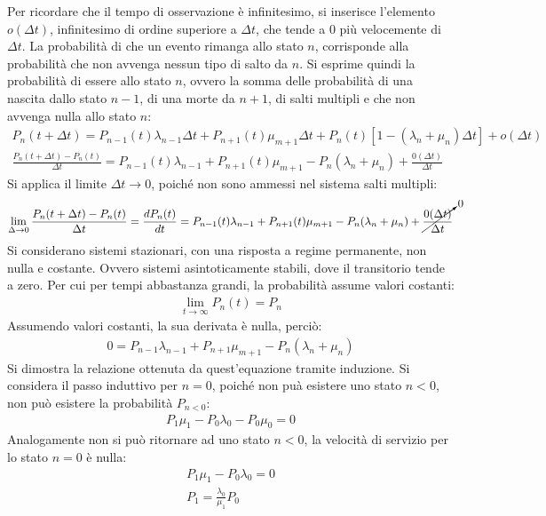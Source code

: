 \documentclass{article}
\numberwithin{equation}{subsection}
\begin{document}
Per ricordare che il tempo di osservazione è infinitesimo, si inserisce l'elemento $o(\Delta t)$, infinitesimo di ordine superiore a $\Delta t$, che tende a $0$ più 
velocemente di $\Delta t$. La probabilità di che un evento rimanga allo stato $n$, corrisponde alla probabilità che non avvenga nessun tipo di salto da $n$. Si 
esprime quindi la probabilità di essere allo stato $n$, ovvero la somma delle probabilità di una nascita dallo stato $n-1$, di una morte da $n+1$, di salti multipli e che 
non avvenga nulla allo stato $n$:
\begin{gather*}
    P_n(t+\Delta t)=P_{n-1}(t)\lambda_{n-1}\Delta t+P_{n+1}(t)\mu_{m+1}\Delta t+P_n(t)[1-(\lambda_n+\mu_n)\Delta t]+o(\Delta t)\\
    \displaystyle\frac{P_n(t+\Delta t)-P_n(t)}{\Delta t}=P_{n-1}(t)\lambda_{n-1}+P_{n+1}(t)\mu_{m+1}-P_n(\lambda_n+\mu_n)+\frac{0(\Delta t)}{\Delta t}
\end{gather*}
Si applica il limite $\Delta t\to0$, poiché non sono ammessi nel sistema salti multipli: 
\begin{gather*}
    \lim_{\Delta \to0}\displaystyle\displaystyle\frac{P_n(t+\Delta t)-P_n(t)}{\Delta t}=\frac{dP_n(t)}{dt}=P_{n-1}(t)\lambda_{n-1}+P_{n+1}(t)\mu_{m+1}-P_n(\lambda_n+\mu_n)+\cancelto{0}{\frac{0(\Delta t)}{\Delta t}}
\end{gather*}
Si considerano sistemi stazionari, con una risposta a regime permanente, non nulla e costante. Ovvero sistemi asintoticamente stabili, dove il transitorio tende a zero. 
Per cui per tempi abbastanza grandi, la probabilità assume valori costanti:
\begin{gather*}
    \displaystyle\lim_{t\to\infty}P_n(t)=P_n
\end{gather*}
Assumendo valori costanti, la sua derivata è nulla, perciò:
\begin{gather*}
    0=P_{n-1}\lambda_{n-1}+P_{n+1}\mu_{m+1}-P_n(\lambda_n+\mu_n)
\end{gather*}
Si dimostra la relazione ottenuta da quest'equazione tramite induzione. Si considera il passo induttivo per $n=0$, poiché non puà esistere uno stato $n<0$, non può esistere 
la probabilità $P_{n<0}$:
\begin{gather*}
    P_1\mu_1-P_0\lambda_0-P_0\mu_0=0
\end{gather*}
Analogamente non si può ritornare ad uno stato $n<0$, la velocità di servizio per lo stato $n=0$ è nulla:
\begin{gather*}
    P_1\mu_1-P_0\lambda_0=0\\
    P_1=\displaystyle\frac{\lambda_0}{\mu_1}P_0
\end{gather*}
\end{document}
